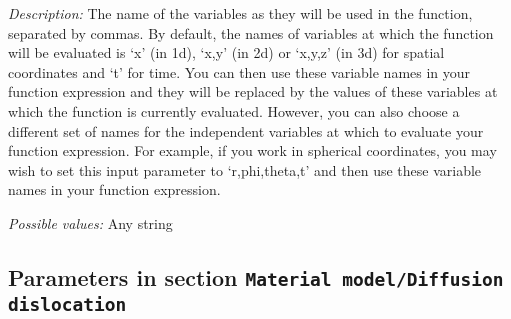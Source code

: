 \begin{itemize}
{\it Description:} The name of the variables as they will be used in the function, separated by commas. By default, the names of variables at which the function will be evaluated is `x' (in 1d), `x,y' (in 2d) or `x,y,z' (in 3d) for spatial coordinates and `t' for time. You can then use these variable names in your function expression and they will be replaced by the values of these variables at which the function is currently evaluated. However, you can also choose a different set of names for the independent variables at which to evaluate your function expression. For example, if you work in spherical coordinates, you may wish to set this input parameter to `r,phi,theta,t' and then use these variable names in your function expression.


{\it Possible values:} Any string
\end{itemize}

\subsection{Parameters in section \tt Material model/Diffusion dislocation}
\label{parameters:Material_20model/Diffusion_20dislocation}

